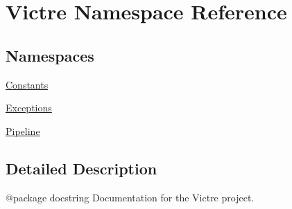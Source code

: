 \hypertarget{namespaceVictre}{\section{Victre Namespace Reference}
\label{namespaceVictre}
}
\subsection*{Namespaces}
\begin{DoxyCompactItemize}
\item 
\hyperlink{namespaceVictre_1_1Constants}{Constants}
\item 
\hyperlink{namespaceVictre_1_1Exceptions}{Exceptions}
\item 
\hyperlink{namespaceVictre_1_1Pipeline}{Pipeline}
\end{DoxyCompactItemize}


\subsection{Detailed Description}
\begin{DoxyVerb}@package docstring
Documentation for the Victre project.
\end{DoxyVerb}
 